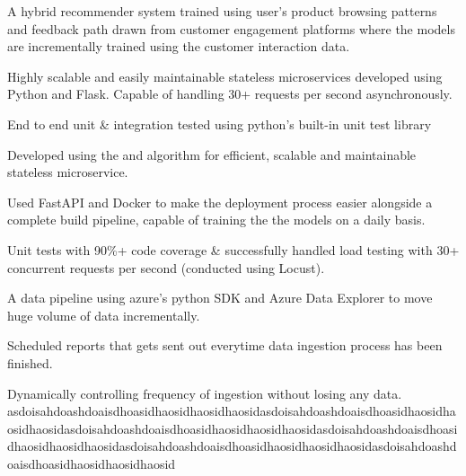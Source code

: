 \vspace{\topsep}


\textbullet{}  \textbullet{}  \textbullet{}  \textbullet{}  

\begin{tightemize}
\item A hybrid recommender system trained using user's product browsing patterns and feedback path drawn from customer engagement platforms where the models are incrementally trained using the customer interaction data.
\item Highly scalable and easily maintainable stateless microservices developed using Python and Flask. Capable of handling 30+ requests per second asynchronously.
\item End to end unit \& integration tested using python's built-in unit test library
\end{tightemize}


 \textbullet{}  \textbullet{}  \textbullet{}  \textbullet{} 

\begin{tightemize}
\item Developed using the  and  algorithm for efficient, scalable and maintainable stateless microservice.
\item Used FastAPI and Docker to make the deployment process easier alongside a complete build pipeline, capable of training the the models on a daily basis.
\item Unit tests with 90\%+ code coverage \& successfully handled load testing with 30+ concurrent requests per second (conducted using Locust).
\end{tightemize}


 \textbullet{}  \textbullet{} 

\begin{tightemize}
\item A data pipeline using azure's python SDK and Azure Data Explorer to move huge volume of data incrementally.
\item Scheduled reports that gets sent out everytime data ingestion process has been finished.
\item Dynamically controlling frequency of ingestion without losing any data. asdoisahdoashdoaisdhoasidhaosidhaosidhaosidasdoisahdoashdoaisdhoasidhaosidhaosidhaosidasdoisahdoashdoaisdhoasidhaosidhaosidhaosidasdoisahdoashdoaisdhoasidhaosidhaosidhaosidasdoisahdoashdoaisdhoasidhaosidhaosidhaosidasdoisahdoashdoaisdhoasidhaosidhaosidhaosid
\end{tightemize}